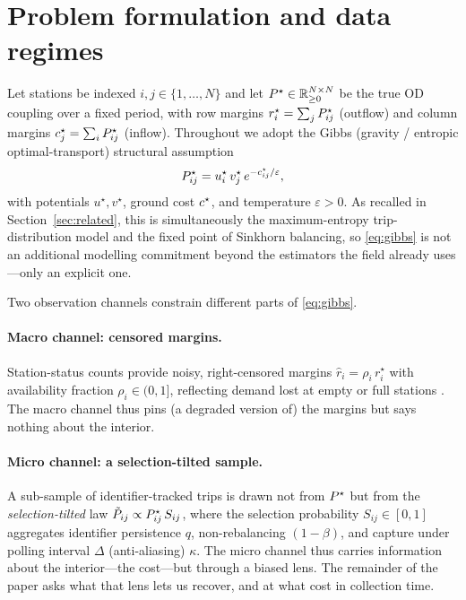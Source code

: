 \section{Problem formulation and data regimes}
\label{sec:formulation}

Let stations be indexed $i,j\in\{1,\dots,N\}$ and let $P^{\star}\in\mathbb{R}_{\ge
0}^{N\times N}$ be the true OD coupling over a fixed period, with row margins
$r^\star_i=\sum_j P^{\star}_{ij}$ (outflow) and column margins
$c^\star_j=\sum_i P^{\star}_{ij}$ (inflow). Throughout we adopt the Gibbs
(gravity / entropic optimal-transport) structural assumption
\begin{equation}
\label{eq:gibbs}
P^{\star}_{ij} = u^\star_i\, v^\star_j\, e^{-c^{\star}_{ij}/\varepsilon},
\end{equation}
with potentials $u^\star,v^\star$, ground cost $c^{\star}$, and temperature
$\varepsilon>0$. As recalled in Section~\ref{sec:related}, this is simultaneously
the maximum-entropy trip-distribution model and the fixed point of Sinkhorn
balancing, so \eqref{eq:gibbs} is not an additional modelling commitment beyond
the estimators the field already uses---only an explicit one.

Two observation channels constrain different parts of \eqref{eq:gibbs}.

\paragraph{Macro channel: censored margins.}
Station-status counts provide noisy, right-censored margins
$\hat r_i = \rho_i\, r^\star_i$ with availability fraction $\rho_i\in(0,1]$,
reflecting demand lost at empty or full stations \citep{RudloffLackner2014,
Negahban2019}. The macro channel thus pins (a degraded version of) the margins
but says nothing about the interior.

\paragraph{Micro channel: a selection-tilted sample.}
A sub-sample of identifier-tracked trips is drawn not from $P^{\star}$ but from the
\emph{selection-tilted} law $\tilde P_{ij}\propto P^{\star}_{ij}\,S_{ij}$, where the
selection probability $S_{ij}\in[0,1]$ aggregates identifier persistence $q$,
non-rebalancing $(1-\beta)$, and capture under polling interval $\Delta$
(anti-aliasing) $\kappa$. The micro channel thus carries information about the
interior---the cost---but through a biased lens. The remainder of the paper
asks what that lens lets us recover, and at what cost in collection time.

